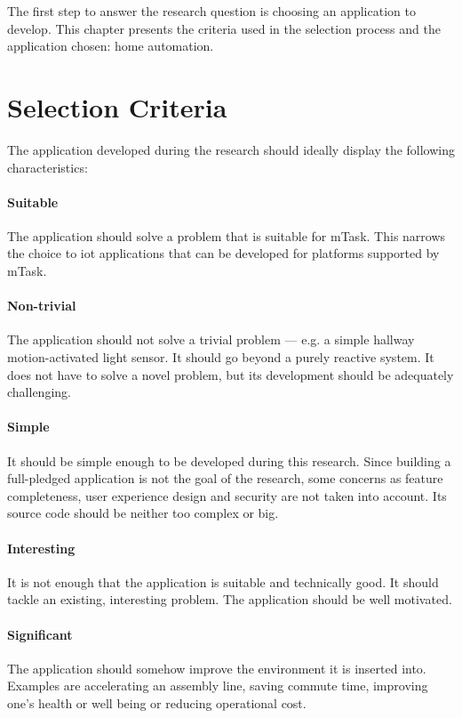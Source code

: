 The first step to answer the research question is choosing an application to develop. This chapter presents the criteria used in the selection process and the application chosen: home automation.

\section{Selection Criteria}\label{sec:selec_cri}

The application developed during the research should ideally display the following characteristics:

\paragraph{Suitable} The application should solve a problem that is suitable for \gls{mTask}. This narrows the choice to \ac{iot} applications that can be developed for platforms supported by \gls{mTask}.

\paragraph{Non-trivial} The application should not solve a trivial problem --- e.g. a simple hallway  motion-activated light sensor. It should go beyond a purely reactive system. It does not have to solve a novel problem, but its development should be adequately challenging.

\paragraph{Simple} It should be simple enough to be developed during this research. Since building a full-pledged application is not the goal of the research, some concerns as feature completeness, user experience design and security are not taken into account. Its source code should be neither too complex or big.

\paragraph{Interesting} It is not enough that the application is suitable and technically good. It should tackle an existing, interesting problem. The application should be well motivated.

\paragraph{Significant} The application should somehow improve the environment it is inserted into. Examples are accelerating an assembly line, saving commute  time, improving one's health or well being or reducing operational cost.

